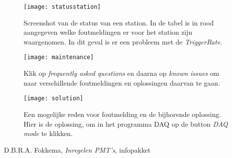 \begin{figure} 
\centering 
\texttt{[image: statusstation]}
\caption{Screenshot van de status van een station. In de tabel is in rood aangegeven 
welke foutmeldingen er voor het station zijn waargenomen. 
In dit geval is er een probleem met de \emph{TriggerRate}.}\label{fig:statusstation} 
\end{figure}

\begin{figure} 
\centering 
\texttt{[image: maintenance]}
\caption{Klik op \emph{frequently asked questions} en daarna op \emph{known issues} om naar verschillende foutmeldingen en oplossingen daarvan te gaan.}\label{fig:maintenance} 
\end{figure}
 
\begin{figure} 
\centering 
\texttt{[image: solution]}
\caption{Een mogelijke reden voor foutmelding en de bijhorende oplossing. Hier is de oplossing, om in het programma \hisparc DAQ op de button \emph{DAQ mode} te klikken.} 
\label{fig:solution} 
\end{figure}




\begin{thebibliography}{9} 
	
	 D.B.R.A. Fokkema, \emph{Inregelen PMT's}, infopakket \hisparc 
\end{thebibliography}




